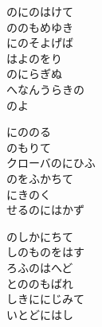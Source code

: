 \documentclass[10pt,b5j]{tarticle} %
\begin{document}
\vspace{1.5em} %
\newcommand{\linespace}{0.5em} %
\newcommand{\blocksize}{0.5\hsize} %
\begin{enumerate} %
    \begin{minipage}[c]{\blocksize}
    
        \vspace{\linespace}
        \item
        のにのはけて\\
        ののもめゆき\\
        にのそよげば\\
        はよのをり\\
        のにらぎぬ\\
        へなんうらきの\\
        のよ
        
        \vspace{\linespace}
        \item
        にののる\\
        のもりて\\
        クローバのにひふ\\
        のをふかちて\\
        にきのく\\
        せるのにはかず
        
        \vspace{\linespace}
        \item
        のしかにちて\\
        しのものをはす\\
        ろふのはへど\\
        とののもばれ\\
        しきににじみて\\
        いとどにはし
        

\end{minipage}
\end{enumerate}
\end{document}
